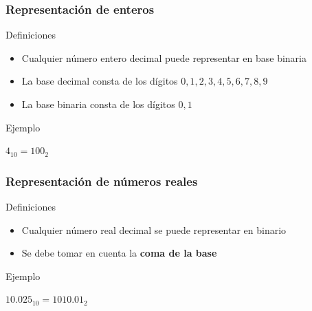 \documentclass{beamer}
\begin{document}
\begin{frame}
	\frametitle{Representación de enteros}
	\begin{block}{Definiciones}
		\begin{itemize}
			\item Cualquier número entero decimal puede representar en base binaria
			\item La base decimal consta de los dígitos $0,1,2,3,4,5,6,7,8,9$
			\item La base binaria consta de los dígitos $0,1$
		\end{itemize}
	\end{block}	
	\begin{exampleblock}{Ejemplo}
		
		\begin{center}
		$4_{10} = 100_{2}$
		\end{center}

	\end{exampleblock}
\end{frame}


\begin{frame}
	\frametitle{Representación de números reales}
	\begin{block}{Definiciones}
		\begin{itemize}
			\item Cualquier número real decimal se puede representar en binario
			\item Se debe tomar en cuenta la \textbf{coma de la base}
		\end{itemize}
	\end{block}	
	\begin{exampleblock}{Ejemplo}
		
		\begin{center}
		$10.025_{10} = 1010.01_{2}$
		\end{center}

	\end{exampleblock}
\end{frame}
\end{document}
